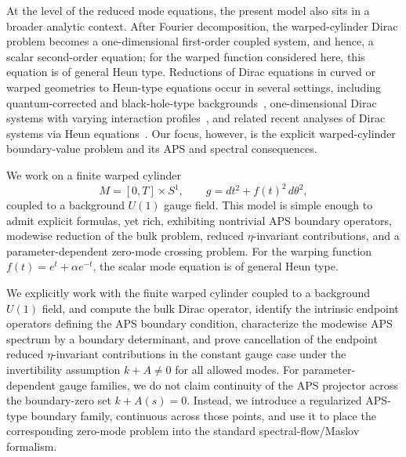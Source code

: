 \documentclass[11pt]{article}
\theoremstyle{definition}
\numberwithin{equation}{section}
\begin{document}
At the level of the reduced mode equations, the present model also sits in a broader analytic context. After Fourier decomposition, the warped-cylinder Dirac problem becomes a one-dimensional first-order coupled system, and hence, a scalar second-order equation; for the warped function considered here, this equation is of general Heun type. Reductions of Dirac equations in curved or warped geometries to Heun-type equations occur in several settings, including quantum-corrected and black-hole-type backgrounds~\cite{Baradaran2025,Filho2023}, one-dimensional Dirac systems with varying interaction profiles~\cite{Ishkhanyan2023}, and related recent analyses of Dirac systems via Heun equations~\cite{Loginov:2022yex,Blas:2025bkt,Blas2026}. Our focus, however, is the explicit warped-cylinder boundary-value problem and its APS and spectral consequences.




We work on a finite warped cylinder
\begin{equation}
M=[0,T]\times S^1,
\qquad
g=dt^2+f(t)^2\,d\theta^2,
\end{equation}
coupled to a background \(U(1)\) gauge field. This model is simple enough to admit explicit formulas, yet rich, exhibiting nontrivial APS boundary operators, modewise reduction of the bulk problem, reduced \(\eta\)-invariant contributions, and a parameter-dependent zero-mode crossing problem. For the warping function \(f(t)=e^t+\alpha e^{-t}\), the scalar mode equation is of general Heun type.

We explicitly work with the finite warped cylinder coupled to a background \(U(1)\) field, and compute the bulk Dirac operator, identify the intrinsic endpoint operators defining the APS boundary condition, characterize the modewise APS spectrum by a boundary determinant, and prove cancellation of the endpoint reduced \(\eta\)-invariant contributions in the constant gauge case under the invertibility assumption \(k+A\neq 0\) for all allowed modes. For parameter-dependent gauge families, we do not claim continuity of the APS projector across the boundary-zero set \(k+A(s)=0\). Instead, we introduce a regularized APS-type boundary family, continuous across those points, and use it to place the corresponding zero-mode problem into the standard spectral-flow/Maslov formalism.
\end{document}

